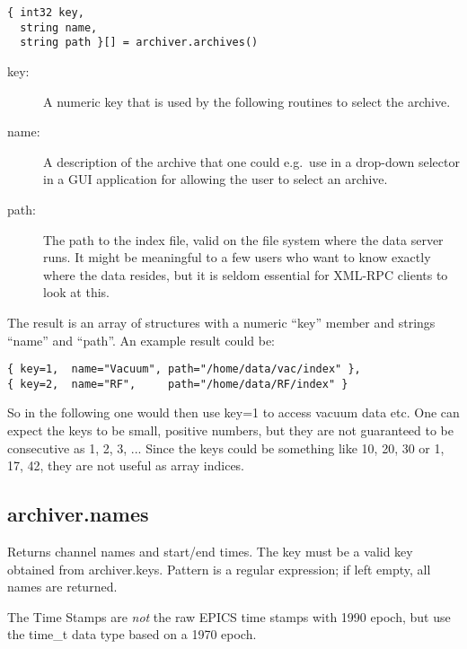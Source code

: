 \begin{lstlisting}[keywordstyle=\sffamily]
{ int32 key, 
  string name, 
  string path }[] = archiver.archives()
\end{lstlisting}

\begin{description}
\item[\sffamily key:] A numeric key that is used by the following
                      routines to select the archive.
\item[\sffamily name:] A description of the archive that one could
                       e.g.\ use in a drop-down selector in a GUI
                       application for allowing the user to select an archive.
\item[\sffamily path:] The path to the index file,  valid on the file
                       system where the data server runs.
                       It might be meaningful to a few users who want to
                       know exactly where the data resides,  but it is
                       seldom essential for XML-RPC clients to look at this.
\end{description}

\noindent The result is an array of structures with a numeric ``key''
member and strings ``name'' and ``path''.
An example result could be:
\begin{lstlisting}[keywordstyle=\sffamily]
{ key=1,  name="Vacuum", path="/home/data/vac/index" },
{ key=2,  name="RF",     path="/home/data/RF/index" }
\end{lstlisting}

\noindent So in the following one would then use key=1 to access
vacuum data etc. One can expect the keys to be small,  positive
numbers,  but they are not guaranteed to be consecutive as 1, 2, 3,
... Since the keys could be something like 10,  20, 30 or 1, 17, 42,
they are not useful as array indices.

\subsection{archiver.names} %
Returns channel names and start/end times.
The key must be a valid key obtained from archiver.keys.
Pattern is a regular expression;
if left empty,  all names are returned.

\NOTE The Time Stamps are \emph{not} the raw EPICS time stamps with 1990 epoch, 
but use the time\_t data type based on a 1970 epoch.

